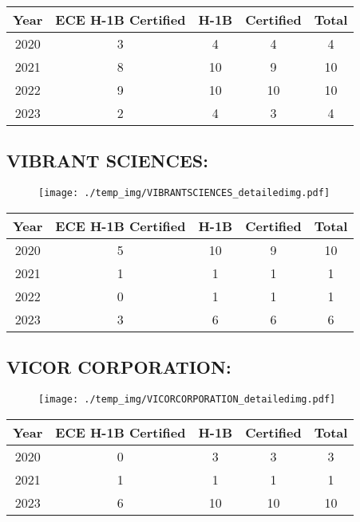 \documentclass{article}%
\begin{document}
%
\begin{longtable}{c|c|c|c|c}%
\hline%
Year&ECE H{-}1B Certified&H{-}1B&Certified&Total\\%
\hline%
2020&3&4&4&4\\%
\hline%
2021&8&10&9&10\\%
\hline%
2022&9&10&10&10\\%
\hline%
2023&2&4&3&4\\%
\hline%
\end{longtable}

%
\newpage%
\subsection{VIBRANT SCIENCES:}%
\label{subsec:VIBRANTSCIENCES}%
\label{VIBRANTSCIENCESdetailed}%


\begin{figure}[htbp]%
\centering%
\texttt{[image: ./temp\_img/VIBRANTSCIENCES\_detailedimg.pdf]}%
\end{figure}

%
\begin{longtable}{c|c|c|c|c}%
\hline%
Year&ECE H{-}1B Certified&H{-}1B&Certified&Total\\%
\hline%
2020&5&10&9&10\\%
\hline%
2021&1&1&1&1\\%
\hline%
2022&0&1&1&1\\%
\hline%
2023&3&6&6&6\\%
\hline%
\end{longtable}

%
\newpage%
\subsection{VICOR CORPORATION:}%
\label{subsec:VICORCORPORATION}%
\label{VICORCORPORATIONdetailed}%


\begin{figure}[htbp]%
\centering%
\texttt{[image: ./temp\_img/VICORCORPORATION\_detailedimg.pdf]}%
\end{figure}

%
\begin{longtable}{c|c|c|c|c}%
\hline%
Year&ECE H{-}1B Certified&H{-}1B&Certified&Total\\%
\hline%
2020&0&3&3&3\\%
\hline%
2021&1&1&1&1\\%
\hline%
2023&6&10&10&10\\%
\hline%
\end{longtable}
\end{document}
